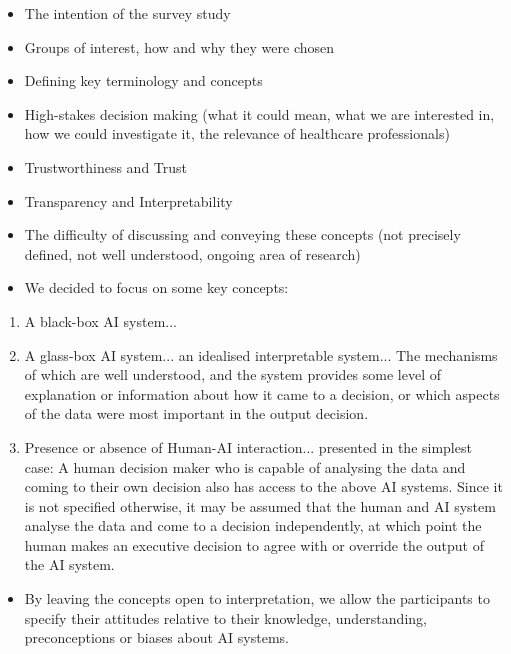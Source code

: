 \documentclass[manuscript,screen,review]{acmart}
\begin{document}
\begin{itemize}
\item The intention of the survey study
\item Groups of interest, how and why they were chosen
\item Defining key terminology and concepts
\end{itemize}
\begin{itemize}
\item High-stakes decision making (what it could mean, what we are interested in, how we could investigate it, the relevance of healthcare professionals)
\item Trustworthiness and Trust
\item Transparency and Interpretability
\end{itemize}
\begin{itemize}
\item The difficulty of discussing and conveying these concepts (not precisely defined, not well understood, ongoing area of research)
\item We decided to focus on some key concepts:
\end{itemize}
\begin{enumerate}
\item A black-box AI system...
\item A glass-box AI system... an idealised interpretable system... The mechanisms of which are well understood, and the system provides some level of explanation or information about how it came to a decision, or which aspects of the data were most important in the output decision.
\item Presence or absence of Human-AI interaction... presented in the simplest case: A human decision maker who is capable of analysing the data and coming to their own decision also has access to the above AI systems. Since it is not specified otherwise, it may be assumed that the human and AI system analyse the data and come to a decision independently, at which point the human makes an executive decision to agree with or override the output of the AI system.  
\end{enumerate}
\begin{itemize}
\item By leaving the concepts open to interpretation, we allow the participants to specify their attitudes relative to their knowledge, understanding, preconceptions or biases about AI systems. 
\end{itemize}
 
\end{document}
